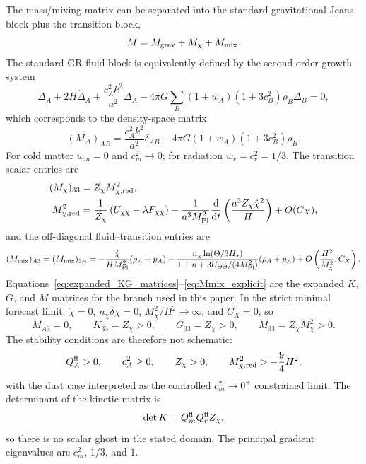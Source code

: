 \documentclass[aps,prd,reprint,nofootinbib,superscriptaddress,longbibliography]{revtex4-2}
\newcommand{\dd}{\mathrm{d}}
\newcommand{\mpl}{M_{\rm Pl}}
\begin{document}
The mass/mixing matrix can be separated into the standard gravitational Jeans block plus the transition block,
\begin{equation}
  M=M_{\rm grav}+M_\chi+M_{\rm mix} .
\end{equation}
The standard GR fluid block is equivalently defined by the second-order growth system
\begin{equation}
  \ddot\Delta_A+2H\dot\Delta_A+\frac{c_A^2k^2}{a^2}\Delta_A
  -4\pi G\sum_B(1+w_A)(1+3c_B^2)\rho_B\Delta_B=0,
  \label{eq:growth_system_from_matrix}
\end{equation}
which corresponds to the density-space matrix
\begin{equation}
  (M_{\Delta})_{AB}=\frac{c_A^2k^2}{a^2}\delta_{AB}
  -4\pi G(1+w_A)(1+3c_B^2)\rho_B .
  \label{eq:Mdensity_block}
\end{equation}
For cold matter $w_m=0$ and $c_m^2\rightarrow0$; for radiation $w_r=c_r^2=1/3$. The transition scalar entries are
\begin{align}
  (M_\chi)_{33}&=Z_\chi M_{\chi,\rm red}^2,
  \label{eq:Mchi_entry}\\
  M_{\chi,\rm red}^2&=\frac{1}{Z_\chi}\left(U_{\chi\chi}-\lambda F_{\chi\chi}\right)
  -\frac{1}{a^3\mpl^2}\frac{\dd}{\dd t}\left(\frac{a^3Z_\chi\dot\chi^2}{H}\right)
  +O(C_X),
  \label{eq:Mchi_reduced_explicit}
\end{align}
and the off-diagonal fluid--transition entries are
\begin{equation}
  (M_{\rm mix})_{A3}=(M_{\rm mix})_{3A}
  =-\frac{\dot\chi}{H\mpl^2}(\rho_A+p_A)
  -\frac{n_\chi\ln(\Theta/3H_\star)}{1+n+3U_{\Theta\Theta}/(4\mpl^2)}(\rho_A+p_A)+O\left(\frac{H^2}{M_\chi^2},C_X\right).
  \label{eq:Mmix_explicit}
\end{equation}
Equations~\eqref{eq:expanded_KG_matrices}--\eqref{eq:Mmix_explicit} are the expanded $K$, $G$, and $M$ matrices for the branch used in this paper. In the strict minimal forecast limit, $\dot\chi=0$, $n_\chi\delta\chi=0$, $M_\chi^2/H^2\rightarrow\infty$, and $C_X=0$, so
\begin{equation}
  M_{A3}=0,
  \qquad
  K_{33}=Z_\chi>0,
  \qquad
  G_{33}=Z_\chi>0,
  \qquad
  M_{33}=Z_\chi M_\chi^2>0 .
  \label{eq:minimal_matrix_limit}
\end{equation}
The stability conditions are therefore not schematic:
\begin{equation}
  Q_A^{\rm fl}>0,
  \qquad c_A^2\ge0,
  \qquad Z_\chi>0,
  \qquad M_{\chi,\rm red}^2>-\frac94H^2,
  \label{eq:expanded_stability_conditions}
\end{equation}
with the dust case interpreted as the controlled $c_m^2\rightarrow0^+$ constrained limit. The determinant of the kinetic matrix is
\begin{equation}
  \det K=Q_m^{\rm fl}Q_r^{\rm fl}Z_\chi,
\end{equation}
so there is no scalar ghost in the stated domain. The principal gradient eigenvalues are $c_m^2$, $1/3$, and $1$.
\end{document}
